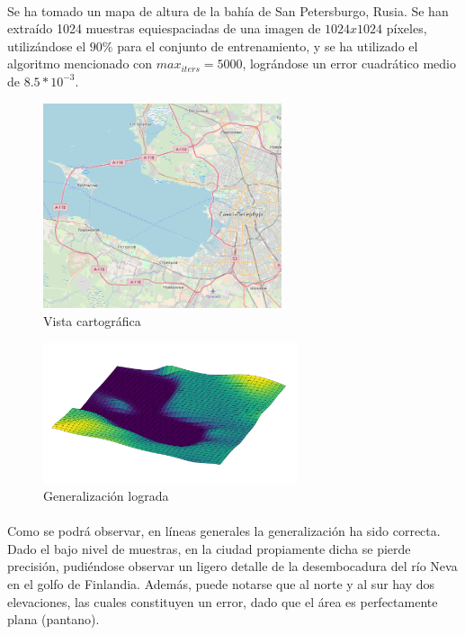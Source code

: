 \documentclass[12pt, twocolumn]{article}
\begin{document}
	\paragraph{} Se ha tomado un mapa de altura de la bahía de San Petersburgo, Rusia. Se han extraído 1024 muestras equiespaciadas de una imagen de $1024x1024$ píxeles, utilizándose el $90\%$ para el conjunto de entrenamiento, y se ha utilizado el algoritmo mencionado con $max_{iters} = 5000$, lográndose un error cuadrático medio de $8.5*10^{-3}$.
	
	\begin{figure}[H]
		\centering
		\includegraphics[width=7cm]{../results/other_terrains/spb/spb_map.png}
		\caption{Vista cartográfica}
		\label{spbmap}
	\end{figure}
	
	
	\begin{figure}[H]
		\centering
		\includegraphics[width=7.5cm]{../results/other_terrains/spb/surf_spb_5000.png}
		\caption{Generalización lograda}
		\label{spb}
	\end{figure}
	
	\paragraph{} Como se podrá observar, en líneas generales la generalización ha sido correcta. Dado el bajo nivel de muestras, en la ciudad propiamente dicha se pierde precisión, pudiéndose observar un ligero detalle de la desembocadura del río Neva en el golfo de Finlandia. Además, puede notarse que al norte y al sur hay dos elevaciones, las cuales constituyen un error, dado que el área es perfectamente plana (pantano). 
	
\end{document}
